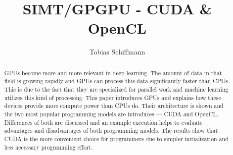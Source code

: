 \documentclass[a4paper,12pt]{llncs}
\numberwithin{equation}{section}
\begin{document}


\author{Tobias Schiffmann}

\title{SIMT/GPGPU - CUDA \& OpenCL}

\maketitle

\thispagestyle{empty}

\begin{abstract}
GPUs become more and more relevant in deep learning.
The amount of data in that field is growing rapidly and GPUs can process this data significantly faster than CPUs.
This is due to the fact that they are specialized for parallel work and machine learning utilizes this kind of processing.
This paper introduces GPUs and explains how these devices provide more compute power than CPUs do.
Their architecture is shown and the two most popular programming models are introduces --- CUDA and OpenCL.
Differences of both are discussed and an example execution helps to evaluate advantages and disadvantages of both programming models.
The results show that CUDA is the more convenient choice for programmers due to simpler initialization and less necessary programming effort.
\end{abstract}











\newpage



\end{document}
